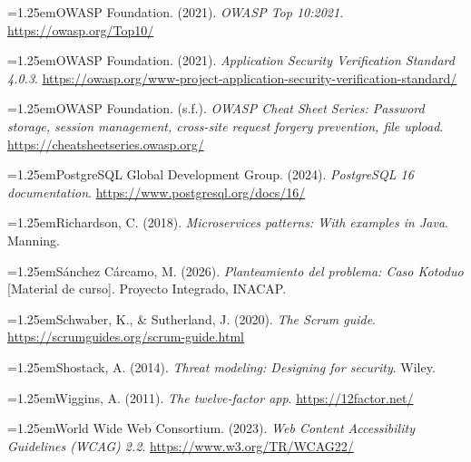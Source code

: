 \documentclass[11pt,a4paper]{article}
\newenvironment{hangparas}{\par\hangindent=1.25em\hangafter=1\noindent}{\par}
\begin{document}
\begin{hangparas}OWASP Foundation. (2021). \textit{OWASP Top 10:2021}. \url{https://owasp.org/Top10/}\end{hangparas}

\begin{hangparas}OWASP Foundation. (2021). \textit{Application Security Verification Standard 4.0.3}. \url{https://owasp.org/www-project-application-security-verification-standard/}\end{hangparas}

\begin{hangparas}OWASP Foundation. (s.f.). \textit{OWASP Cheat Sheet Series: Password storage, session management, cross-site request forgery prevention, file upload}. \url{https://cheatsheetseries.owasp.org/}\end{hangparas}

\begin{hangparas}PostgreSQL Global Development Group. (2024). \textit{PostgreSQL 16 documentation}. \url{https://www.postgresql.org/docs/16/}\end{hangparas}

\begin{hangparas}Richardson, C. (2018). \textit{Microservices patterns: With examples in Java}. Manning.\end{hangparas}

\begin{hangparas}Sánchez Cárcamo, M. (2026). \textit{Planteamiento del problema: Caso Kotoduo} [Material de curso]. Proyecto Integrado, INACAP.\end{hangparas}

\begin{hangparas}Schwaber, K., \& Sutherland, J. (2020). \textit{The Scrum guide}. \url{https://scrumguides.org/scrum-guide.html}\end{hangparas}

\begin{hangparas}Shostack, A. (2014). \textit{Threat modeling: Designing for security}. Wiley.\end{hangparas}

\begin{hangparas}Wiggins, A. (2011). \textit{The twelve-factor app}. \url{https://12factor.net/}\end{hangparas}

\begin{hangparas}World Wide Web Consortium. (2023). \textit{Web Content Accessibility Guidelines (WCAG) 2.2}. \url{https://www.w3.org/TR/WCAG22/}\end{hangparas}
\end{document}

